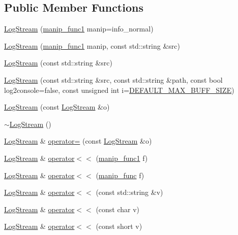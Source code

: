 \subsection*{Public Member Functions}
\begin{DoxyCompactItemize}
\item 
\hyperlink{a00031_a8244d37bf4c6672cfc0351b3f294a54f}{Log\-Stream} (\hyperlink{a00031_ab6994c757d4c63c4388a932cf2be2c9d}{manip\-\_\-func1} manip=info\-\_\-normal)
\item 
\hyperlink{a00031_a0930cbb1c090d6b8fc8b102286c9b926}{Log\-Stream} (\hyperlink{a00031_ab6994c757d4c63c4388a932cf2be2c9d}{manip\-\_\-func1} manip, const std\-::string \&src)
\item 
\hyperlink{a00031_a69ca636671642a5340a270e4f22acfaa}{Log\-Stream} (const std\-::string \&src)
\item 
\hyperlink{a00031_a6fd5fd45724810d833db3ce5b0c6d8c4}{Log\-Stream} (const std\-::string \&src, const std\-::string \&path, const bool log2console=false, const unsigned int i=\hyperlink{a00067_a4ea9e3032a294c731fcfa3401f82ea98}{D\-E\-F\-A\-U\-L\-T\-\_\-\-M\-A\-X\-\_\-\-B\-U\-F\-F\-\_\-\-S\-I\-Z\-E})
\item 
\hyperlink{a00031_a76dbd7329fb9089fff830a650535085e}{Log\-Stream} (const \hyperlink{a00031}{Log\-Stream} \&o)
\item 
\hyperlink{a00031_ae2b779d35193c4eb8dbefd4c0ae5e51b}{$\sim$\-Log\-Stream} ()
\item 
\hyperlink{a00031}{Log\-Stream} \& \hyperlink{a00031_a36c0df879f5c8aad154c7989cacf72c3}{operator=} (const \hyperlink{a00031}{Log\-Stream} \&o)
\item 
\hyperlink{a00031}{Log\-Stream} \& \hyperlink{a00031_a8c5790a046e735254faa31ac5e5be57a}{operator$<$$<$} (\hyperlink{a00031_ab6994c757d4c63c4388a932cf2be2c9d}{manip\-\_\-func1} f)
\item 
\hyperlink{a00031}{Log\-Stream} \& \hyperlink{a00031_a0e172406664a3f1b6da344675795ee22}{operator$<$$<$} (\hyperlink{a00031_abb058ef2b1b57fb7e0b89c3312794ada}{manip\-\_\-func} f)
\item 
\hyperlink{a00031}{Log\-Stream} \& \hyperlink{a00031_a02180d2e0d8f61c26e0b68912f0508c0}{operator$<$$<$} (const std\-::string \&v)
\item 
\hyperlink{a00031}{Log\-Stream} \& \hyperlink{a00031_a1d015fcec83dc091a2cb474ff5d335ce}{operator$<$$<$} (const char v)
\item 
\hyperlink{a00031}{Log\-Stream} \& \hyperlink{a00031_a64e3c679c6f5392587aa5d0d30083b12}{operator$<$$<$} (const short v)

\end{DoxyCompactItemize}
